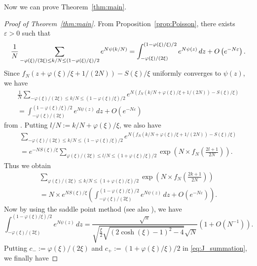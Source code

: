 Now we can prove Theorem~\ref{thm:main}.
\begin{proof}[Proof of Theorem~\ref{thm:main}]
From Proposition~\ref{prop:Poisson}, there exists $\varepsilon>0$ such that
\begin{equation*}
  \frac{1}{N}
  \sum_{-\varphi(\xi)/(2\xi)\le k/N\le(1-\varphi(\xi)/\xi)/2}
  e^{N\psi(k/N)}
  \\
  =
  \int_{-\varphi(\xi)/(2\xi)}^{(1-\varphi(\xi)/\xi)/2}
  e^{N\psi(z)}\,dz
  +
  O\left(e^{-N\varepsilon}\right).
\end{equation*}
Since $f_N(z+\varphi(\xi)/\xi+1/(2N))-S(\xi)/\xi$ uniformly converges to $\psi(z)$, we have
\begin{multline*}
  \frac{1}{N}
  \sum_{-\varphi(\xi)/(2\xi)\le k/N\le(1-\varphi(\xi)/\xi)/2}
  e^{N\left(f_N(k/N+\varphi(\xi)/\xi+1/(2N))-S(\xi)/\xi\right)}
  \\
  =
  \int_{-\varphi(\xi)/(2\xi)}^{(1-\varphi(\xi)/\xi)/2}
  e^{N\psi(z)}\,dz
  +O(e^{-N\varepsilon})
\end{multline*}
from \cite[Remark~4.4]{Ohtsuki:QT2016}.
Putting $l/N:=k/N+\varphi(\xi)/\xi$, we also have
\begin{multline*}
  \sum_{-\varphi(\xi)/(2\xi)\le k/N\le(1-\varphi(\xi)/\xi)/2}
  e^{N\left(f_N\left(k/N+\varphi(\xi)/\xi+1/(2N)\right)-S(\xi)/\xi\right)}
  \\
  =
  e^{-N S(\xi)/\xi}
  \sum_{\varphi(\xi)/(2\xi)\le l/N\le(1+\varphi(\xi)/\xi)/2}
  \exp\left(N\times f_N\left(\frac{2l+1}{2N}\right)\right).
\end{multline*}
Thus we obtain
\begin{multline}\label{eq:Poisson_f_N}
  \sum_{\varphi(\xi)/(2\xi)\le k/N\le(1+\varphi(\xi)/\xi)/2}
  \exp\left(N\times f_N\left(\frac{2k+1}{2N}\right)\right)
  \\
  =
  N\times e^{N S(\xi)/\xi}
  \left(
    \int_{-\varphi(\xi)/(2\xi)}^{(1-\varphi(\xi)/\xi)/2}
    e^{N\psi(z)}\,dz
    +
    O\left(e^{-N\varepsilon}\right)
  \right).
\end{multline}
Now by using the saddle point method \cite[Proposition~3.2]{Ohtsuki:QT2016} (see also \cite[Remark~3.3]{Ohtsuki:QT2016}), we have
\begin{equation}\label{eq:saddle}
  \int_{-\varphi(\xi)/(2\xi)}^{(1-\varphi(\xi)/\xi)/2}
  e^{N\psi(z)}\,dz
  =
  \frac{\sqrt{\pi}}{\sqrt{\frac{\xi}{2}\sqrt{(2\cosh(\xi)-1)^2-4}}\sqrt{N}}
  \left(
    1+O(N^{-1})
  \right).
\end{equation}
Putting $c_{-}:=\varphi(\xi)/(2\xi)$ and $c_{+}:=(1+\varphi(\xi)/\xi)/2$ in \eqref{eq:J_summation}, we finally have

\end{proof}
